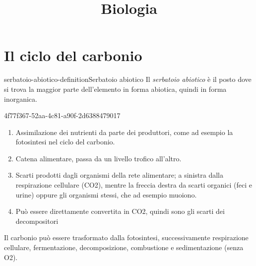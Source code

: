 \documentclass[preview]{standalone}
\begin{document}
\title{Biologia}
\genpage

\section{Il ciclo del carbonio}

\begin{snippetdefinition}{serbatoio-abiotico-definition}{Serbatoio abiotico}
    Il \textit{serbatoio abiotico} 
    è il posto dove si trova la maggior parte dell'elemento in forma abiotica,
    quindi in forma inorganica.
\end{snippetdefinition}



\begin{snippet}{4f77f367-52aa-4c81-a90f-2d6388479017}
    \begin{enumerate}
        \item Assimilazione dei nutrienti da parte dei produttori, come ad esempio la fotosintesi nel ciclo del carbonio. 
        \item Catena alimentare, passa da un livello trofico all'altro. 
        \item Scarti prodotti dagli organismi della rete alimentare; a sinistra dalla respirazione cellulare (CO2), mentre la freccia destra da scarti organici (feci e urine) oppure gli organismi stessi, che ad esempio muoiono.
        \item Può essere direttamente convertita in CO2, quindi sono gli scarti dei decompositori
    \end{enumerate}
    
    Il carbonio può essere trasformato dalla fotosintesi, successivamente 
    respirazione cellulare, fermentazione, decomposizione, combustione e sedimentazione (senza O2).
\end{snippet}
\end{document}
